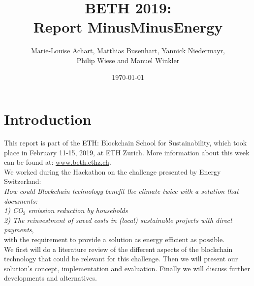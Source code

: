 \documentclass[11pt]{article}
\title{BETH 2019:\\Report MinusMinusEnergy}
\author{Marie-Louise Achart, Matthias Busenhart, Yannick Niedermayr,\\Philip Wiese and Manuel Winkler}
\date{\today}
\begin{document}
\maketitle
\thispagestyle{empty}
\newpage
\tableofcontents

\section{Introduction}
This report is part of the ETH: Blockchain School for Sustainability, which took place in February 11-15, 2019, at ETH Zurich. More information about this week can be found at: \hyperref[www.beth.ethz.ch]{www.beth.ethz.ch}.\\
We worked during the Hackathon on the challenge presented by Energy Switzerland:\\ \textit{How could Blockchain technology benefit the climate twice with a solution that documents:\\
1) CO$_2$ emission reduction by households\\
2) The reinvestment of saved costs in (local) sustainable projects with direct payments},\\
with the requirement to provide a solution as energy efficient as possible.\\
We first will do a literature review of the different aspects of the blockchain technology that could be relevant for this challenge. Then we will present our solution's concept, implementation and evaluation. Finally we will discuss further developments and alternatives.\\
\end{document}
